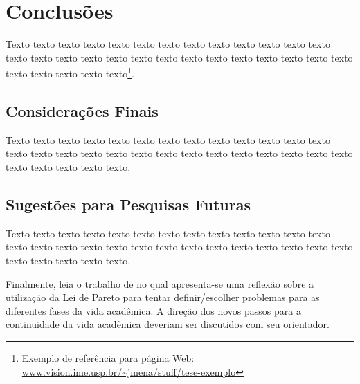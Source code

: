\chapter{Conclusões}
\label{cap:conclusoes}

Texto texto texto texto texto texto texto texto texto texto texto texto texto
texto texto texto texto texto texto texto texto texto texto texto texto texto
texto texto texto texto texto texto\footnote{Exemplo de referência para página
Web: \url{www.vision.ime.usp.br/~jmena/stuff/tese-exemplo}}.

\section{Considerações Finais}

Texto texto texto texto texto texto texto texto texto texto texto texto texto
texto texto texto texto texto texto texto texto texto texto texto texto texto
texto texto texto texto texto texto.

\section{Sugestões para Pesquisas Futuras}

Texto texto texto texto texto texto texto texto texto texto texto texto texto
texto texto texto texto texto texto texto texto texto texto texto texto texto
texto texto texto texto texto texto.

Finalmente, leia o trabalho de \citet{alon09:how} no qual apresenta-se
uma reflexão sobre a utilização da Lei de Pareto para tentar definir/escolher
problemas para as diferentes fases da vida acadêmica.  A direção dos novos
passos para a continuidade da vida acadêmica deveriam ser discutidos com seu
orientador.
